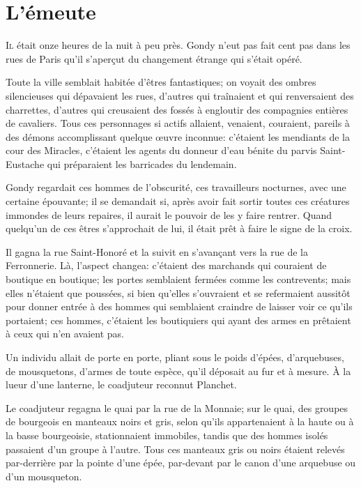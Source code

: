\chapter{L'émeute}

\lettrine{I}{l} était onze heures de la nuit à peu près. Gondy n'eut pas fait cent pas dans les rues de Paris qu'il s'aperçut du changement étrange qui s'était opéré.

\zz
Toute la ville semblait habitée d'êtres fantastiques; on voyait des ombres silencieuses qui dépavaient les rues, d'autres qui traînaient et qui renversaient des charrettes, d'autres qui creusaient des fossés à engloutir des compagnies entières de cavaliers. Tous ces personnages si actifs allaient, venaient, couraient, pareils à des démons accomplissant quelque œuvre inconnue: c'étaient les mendiants de la cour des Miracles, c'étaient les agents du donneur d'eau bénite du parvis Saint-Eustache qui préparaient les barricades du lendemain.

Gondy regardait ces hommes de l'obscurité, ces travailleurs nocturnes, avec une certaine épouvante; il se demandait si, après avoir fait sortir toutes ces créatures immondes de leurs repaires, il aurait le pouvoir de les y faire rentrer. Quand quelqu'un de ces êtres s'approchait de lui, il était prêt à faire le signe de la croix.

Il gagna la rue Saint-Honoré et la suivit en s'avançant vers la rue de la Ferronnerie. Là, l'aspect changea: c'étaient des marchands qui couraient de boutique en boutique; les portes semblaient fermées comme les contrevents; mais elles n'étaient que poussées, si bien qu'elles s'ouvraient et se refermaient aussitôt pour donner entrée à des hommes qui semblaient craindre de laisser voir ce qu'ils portaient; ces hommes, c'étaient les boutiquiers qui ayant des armes en prêtaient à ceux qui n'en avaient pas.

Un individu allait de porte en porte, pliant sous le poids d'épées, d'arquebuses, de mousquetons, d'armes de toute espèce, qu'il déposait au fur et à mesure. À la lueur d'une lanterne, le coadjuteur reconnut Planchet.

Le coadjuteur regagna le quai par la rue de la Monnaie; sur le quai, des groupes de bourgeois en manteaux noirs et gris, selon qu'ils appartenaient à la haute ou à la basse bourgeoisie, stationnaient immobiles, tandis que des hommes isolés passaient d'un groupe à l'autre. Tous ces manteaux gris ou noirs étaient relevés par-derrière par la pointe d'une épée, par-devant par le canon d'une arquebuse ou d'un mousqueton.

